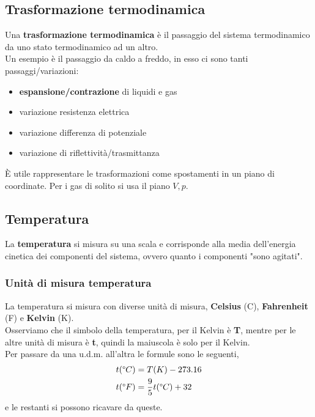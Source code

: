     \subsection{Trasformazione termodinamica}
        Una \textbf{trasformazione termodinamica} è il passaggio del sistema termodinamico da uno stato termodinamico ad un altro.\\
        Un esempio è il passaggio da caldo a freddo, in esso ci sono tanti passaggi/variazioni:
        \begin{itemize}
            \item \textbf{espansione/contrazione} di liquidi e gas\\
            \item variazione resistenza elettrica\\
            \item variazione differenza di potenziale\\
            \item variazione di riflettività/trasmittanza
        \end{itemize}
        È utile rappresentare le trasformazioni come spostamenti in un piano di coordinate. Per i gas di solito si usa il piano $V, p$.

    \subsection{Temperatura}
        La \textbf{temperatura} si misura su una scala e corrisponde alla media dell'energia cinetica dei componenti del sistema, ovvero quanto i componenti "sono agitati".

        \subsubsection{Unità di misura temperatura}
            La temperatura si misura con diverse unità di misura, \textbf{Celsius} (\degree{}C), \textbf{Fahrenheit} (\degree{}F) e \textbf{Kelvin} (K).\\
            Osserviamo che il simbolo della temperatura, per il Kelvin è \textbf{T}, mentre per le altre unità di misura è \textbf{t}, quindi la maiuscola è solo per il Kelvin.\\
            Per passare da una u.d.m. all'altra le formule sono le seguenti,
            \begin{align*}
                &t(\degree{}C)=T(K) - 273.16\\
                &t(\degree{}F)=\frac{9}{5}t(\degree{}C) + 32
            \end{align*}
            e le restanti si possono ricavare da queste.

